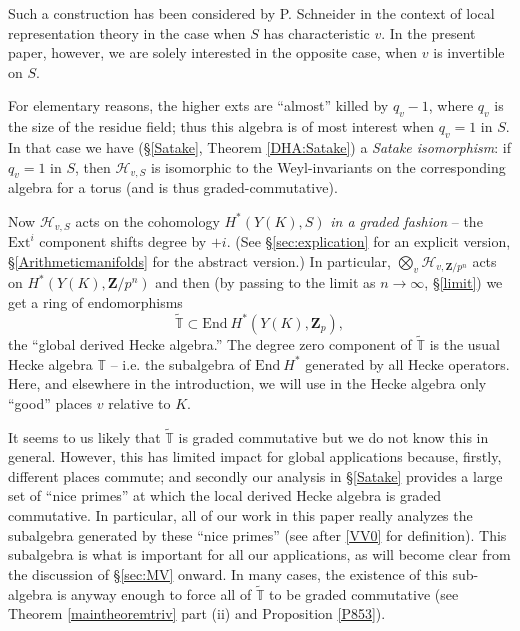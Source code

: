 \documentclass[10pt]{amsart}
\newcommand{\changecolor}{black}
\newcommand{\Z}{\mathbf{Z}}
\newcommand{\Ext}{\mathrm{Ext}}
\newcommand{\gHecke}{\tilde{\mathbb{T}}}
\newcommand{\End}{\mathrm{End}}
\newcommand{\dHecke}{\mathscr{H}}
\theoremstyle{remark}
\begin{document}
 Such a construction has been considered by P. Schneider \cite{Schneider} in the context of local representation theory in the case when $S$ has  characteristic $v$.  
In the present paper, however, we are solely interested in the opposite case, when $v$ is invertible on $S$. 

  
For elementary reasons, the higher exts are ``almost'' killed by $q_v-1$, where $q_v$ is the size of the residue field; thus this algebra is of most interest when $q_v=1$ in $S$. 
In that case we have (\S \ref{Satake}, Theorem \ref{DHA:Satake}) a {\em   Satake isomorphism}: if $q_v=1$ in $S$,  then
  $ \mathscr{H}_{v,S}$ is isomorphic to the Weyl-invariants on the corresponding algebra for a torus (and is thus   graded-commutative).  
  
Now $\dHecke_{v,S}$ acts on the cohomology $H^*(Y(K), S)$  {\em in a graded fashion} -- the $\Ext^i$ component shifts degree by $+i$. (See 
 \S \ref{sec:explication}  for an explicit version, \S \ref{Arithmeticmanifolds} for the abstract version.)  In particular,
$\bigotimes_{v} \dHecke_{v,\Z/p^n}$  acts on $H^*(Y(K), \Z/p^n)$ and then
  (by passing to the limit as $n \rightarrow \infty$, \S \ref{limit}) we get a  ring of endomorphisms  
  $$ \gHecke \subset \End   \ H^*(Y(K), \Z_{p}),$$
  the ``global derived Hecke algebra.''  
  The degree zero component of $\gHecke$ is the usual Hecke algebra $\mathbb{T}$ -- i.e. the  subalgebra
  of $\End \ H^*$ generated by all Hecke operators.  Here, and elsewhere in the introduction,
  we will use in the Hecke algebra only ``good'' places $v$ relative to $K$. 
  
  {\color{\changecolor} 
   It seems to us likely that $\gHecke$ is graded commutative
   but we do not know this in general.  However, this has limited impact  for global applications because, firstly, different places commute; and secondly 
   our analysis in \S \ref{Satake} provides a large set of ``nice primes''
   at which the local derived Hecke algebra is graded commutative. In particular, 
   all of our work in this paper really analyzes the subalgebra generated by these ``nice primes''  (see    after  \eqref{VV0} for definition). 
This subalgebra is what is important  for all our applications, as will become clear from the discussion of \S \ref{sec:MV} onward. 
In many cases,  the existence of this sub-algebra is  anyway enough to force all of $\gHecke$ to be graded commutative (see Theorem \ref{maintheoremtriv} part (ii) and Proposition \ref{P853}).  }
  
   
    
\end{document}
